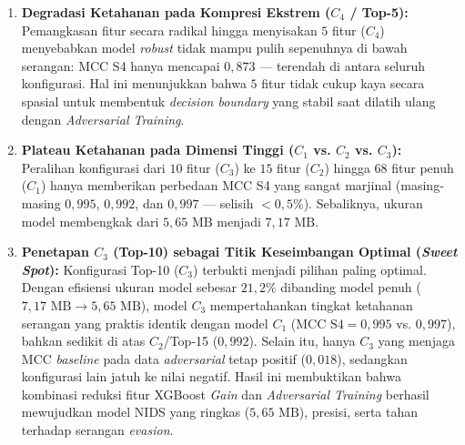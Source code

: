 \documentclass[11pt, a4paper]{article}
\begin{document}
\begin{enumerate}
    \item \textbf{Degradasi Ketahanan pada Kompresi Ekstrem ($C_4$ / Top-5):}
    Pemangkasan fitur secara radikal hingga menyisakan $5$ fitur ($C_4$) menyebabkan model \textit{robust} tidak mampu pulih sepenuhnya di bawah serangan: MCC S4 hanya mencapai $0{,}873$ --- terendah di antara seluruh konfigurasi. Hal ini menunjukkan bahwa $5$ fitur tidak cukup kaya secara spasial untuk membentuk \textit{decision boundary} yang stabil saat dilatih ulang dengan \textit{Adversarial Training}.

    \item \textbf{Plateau Ketahanan pada Dimensi Tinggi ($C_1$ vs. $C_2$ vs. $C_3$):}
    Peralihan konfigurasi dari $10$ fitur ($C_3$) ke $15$ fitur ($C_2$) hingga $68$ fitur penuh ($C_1$) hanya memberikan perbedaan MCC S4 yang sangat marjinal (masing-masing $0{,}995$, $0{,}992$, dan $0{,}997$ --- selisih $< 0{,}5\%$). Sebaliknya, ukuran model membengkak dari $5{,}65\text{ MB}$ menjadi $7{,}17\text{ MB}$.

    \item \textbf{Penetapan $C_3$ (Top-10) sebagai Titik Keseimbangan Optimal (\textit{Sweet Spot}):}
    Konfigurasi Top-10 ($C_3$) terbukti menjadi pilihan paling optimal. Dengan efisiensi ukuran model sebesar $21{,}2\%$ dibanding model penuh ($7{,}17\text{ MB} \rightarrow 5{,}65\text{ MB}$), model $C_3$ mempertahankan tingkat ketahanan serangan yang praktis identik dengan model $C_1$ ($\text{MCC S4} = 0{,}995$ vs. $0{,}997$), bahkan sedikit di atas $C_2$/Top-15 ($0{,}992$). Selain itu, hanya $C_3$ yang menjaga MCC \textit{baseline} pada data \textit{adversarial} tetap positif ($0{,}018$), sedangkan konfigurasi lain jatuh ke nilai negatif. Hasil ini membuktikan bahwa kombinasi reduksi fitur XGBoost \textit{Gain} dan \textit{Adversarial Training} berhasil mewujudkan model NIDS yang ringkas ($5{,}65\text{ MB}$), presisi, serta tahan terhadap serangan \textit{evasion}.
\end{enumerate}
\end{document}
